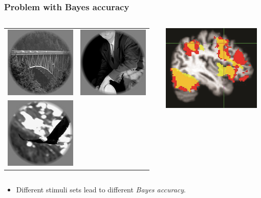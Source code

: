 \documentclass{beamer}
\begin{document}
\begin{frame}
\frametitle{Problem with Bayes accuracy}
\begin{columns}
\begin{column}{0.6\textwidth}
\begin{tabular}{cc}
\includegraphics[scale = 0.5]{img1.png} &
\includegraphics[scale = 0.5]{img2.png} \\
\includegraphics[scale = 0.5]{img3.png} &
\end{tabular}
\end{column}
\begin{column}{0.4\textwidth}
\includegraphics[scale = 0.5]{smbrain1.png}
\end{column}
\end{columns}
\begin{itemize}
\item Different stimuli sets lead to different \emph{Bayes accuracy}.
\end{itemize}
\end{frame}
\end{document}
